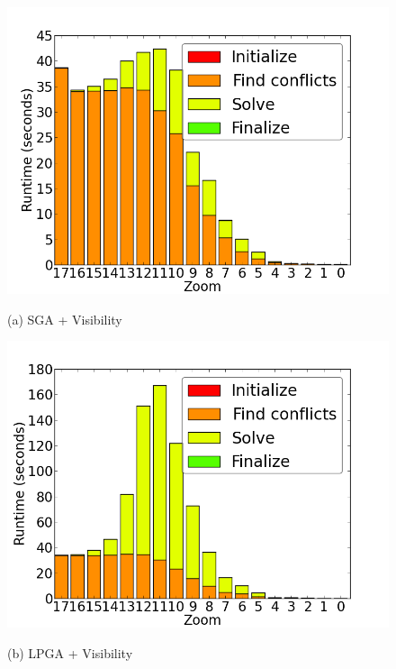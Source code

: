 \begin{figure}[tb]
  \begin{minipage}{0.329\linewidth}
    \centerline{\includegraphics[width=1.0\linewidth]{./figs/prelim_pnt_500k_tourism_heuristic_A.png}}
    \centerline{(a) SGA + Visibility}
  \end{minipage} \hfill
  \begin{minipage}{0.329\linewidth}
    \centerline{\includegraphics[width=1.0\linewidth]{./figs/prelim_pnt_500k_tourism_lp_A.png}}
    \centerline{(b) LPGA + Visibility}
  \end{minipage} \hfill
  \begin{minipage}{0.329\linewidth}

\end{minipage}
\end{figure}
